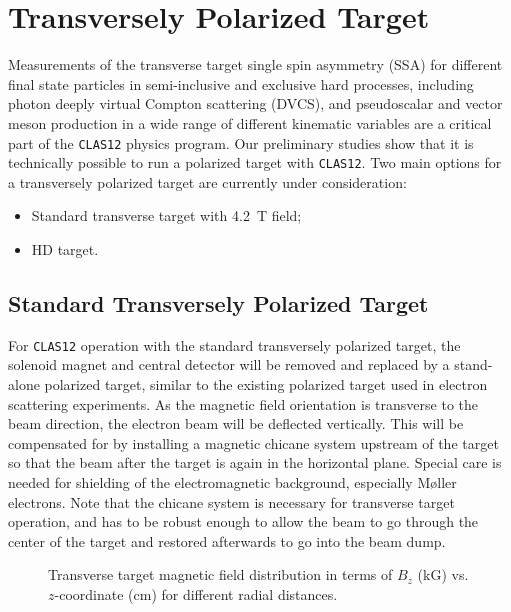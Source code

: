 \section{Transversely Polarized Target}

Measurements of the transverse target single spin asymmetry (SSA) for 
different final state particles in semi-inclusive and exclusive hard 
processes, including photon deeply virtual Compton scattering (DVCS), and
pseudoscalar and vector meson production in a wide range of different 
kinematic variables are a critical part of the {\tt CLAS12} physics program.
Our preliminary studies show that it is technically possible to run a 
polarized target with {\tt CLAS12}.  Two main options for a transversely 
polarized target are currently under consideration:

\begin{itemize}
\item Standard transverse target with 4.2~T field;
\item HD target.
\end{itemize}

\subsection{Standard Transversely Polarized Target}

For {\tt CLAS12} operation with the standard transversely polarized
target, the solenoid magnet and central detector will be removed 
and replaced by a stand-alone polarized target, similar to the existing 
polarized target used in electron scattering experiments.  As the magnetic 
field orientation is transverse to the beam direction, the electron beam 
will be deflected vertically. This will be compensated for by installing a 
magnetic chicane system upstream of the target so that the beam after the
target is again in the horizontal plane.  Special care is needed for 
shielding of the electromagnetic background, especially M{\o}ller electrons.
Note that the chicane system is necessary for transverse target operation,
and has to be robust enough to allow the beam to go through the center of 
the target and restored afterwards to go into the beam dump.

\begin{figure}
\begin{center}
\vskip -0.2cm
\caption{\small{Transverse target magnetic field distribution in terms of
$B_z$ (kG) vs. $z$-coordinate (cm) for different radial distances.}}
\label{fig:solfield}
\end{center}
\end{figure}

